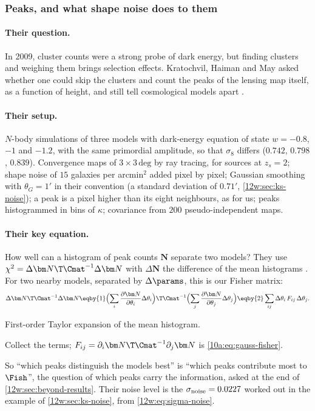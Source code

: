\subsubsection{Peaks, and what shape noise does to them}
\label{12w:sec:repro-kratochvil}

\paragraph{Their question.} In 2009, cluster counts were a strong probe of dark energy, but finding clusters and
weighing them brings selection effects. Kratochvil, Haiman and May asked whether one could skip the clusters and
count the peaks of the lensing map itself, as a function of height, and still tell cosmological models apart
\cite{Kratochvil2010}.

\paragraph{Their setup.} $N$-body simulations of three models with dark-energy equation of state $w=-0.8$, $-1$ and
$-1.2$, with the same primordial amplitude, so that $\sigma_8$ differs ($0.742$, $0.798$, $0.839$). Convergence maps
of $3\times3\,\mathrm{deg}$ by ray tracing, for sources at $z_s=2$; shape noise of $15$ galaxies per arcmin$^2$
added pixel by pixel; Gaussian smoothing with $\theta_G=1'$ in their convention (a standard deviation of $0.71'$,
\cref{12w:sec:ks-noise}); a peak is a pixel higher than its eight neighbours, as for us; peaks histogrammed in bins of
$\kappa$; covariance from $200$ pseudo-independent maps.

\paragraph{Their key equation.} How well can a histogram of peak counts $\bm N$ separate two models? They use
$\chi^2=\Delta\bm N\T\Cmat^{-1}\Delta\bm N$ with $\Delta\bm N$ the difference of the mean histograms
\cite[eq.~14]{Kratochvil2010}. For two nearby models, separated by $\Delta\params$, this is our Fisher matrix:
\begin{equation}
\Delta\bm N\T\Cmat^{-1}\Delta\bm N\eqby{1}\Bigl(\sum_i\frac{\partial\bm N}{\partial\theta_i}\Delta\theta_i\Bigr)\T
\Cmat^{-1}\Bigl(\sum_j\frac{\partial\bm N}{\partial\theta_j}\Delta\theta_j\Bigr)
\eqby{2}\sum_{ij}\Delta\theta_i\,F_{ij}\,\Delta\theta_j .
\label{12w:eq:krat-chi2}
\end{equation}
\begin{explain}
  \item First-order Taylor expansion of the mean histogram.
  \item Collect the terms; $F_{ij}=\partial_i\bm N\T\Cmat^{-1}\partial_j\bm N$ is \eqref{10a:eq:gauss-fisher}.
\end{explain}
So ``which peaks distinguish the models best'' is ``which peaks contribute most to $\Fish$'', the question of which peaks carry the
information, asked at the end of \cref{12w:sec:beyond-results}. Their noise level is the $\sigma_{\rm noise}=0.0227$ worked out in the
example of \cref{12w:sec:ks-noise}, from \eqref{12w:eq:sigma-noise}.

